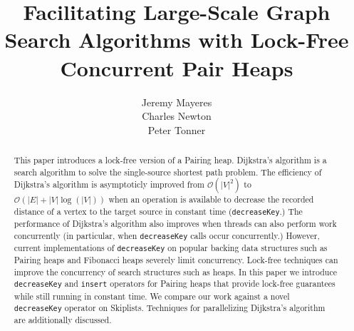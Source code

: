 \documentclass{acm_proc_article-sp}
\title{Facilitating Large-Scale Graph Search Algorithms with Lock-Free Concurrent Pair Heaps}
\author{
\alignauthor
Jeremy Mayeres \\
\email{jeremym@knights.ucf.edu}
%
\alignauthor
Charles Newton \\
\email{newton@knights.ucf.edu}
%
\alignauthor
Peter Tonner \\
\email{ptonner@knights.ucf.edu}
}
\begin{document}
\maketitle
\begin{abstract}
This paper introduces a lock-free version of a Pairing heap.
Dijkstra's algorithm is a search algorithm to solve
the single-source shortest path problem. The efficiency
of Dijkstra's algorithm is asymptoticly improved
from $\mathcal{O}(|V|^2)$ to $\mathcal{O}(|E| + |V|\log(|V|))$ when
an operation is available to decrease the recorded distance of a vertex
to the target source in constant time (\texttt{decreaseKey}.)
The performance of Dijkstra's algorithm
also improves when threads can also perform work concurrently (in particular, when
\texttt{decreaseKey} calls occur concurrently.) However, current implementations of
\texttt{decreaseKey} on popular backing data structures such as Pairing heaps and Fibonacci heaps
severely limit concurrency. Lock-free techniques can improve the concurrency of search structures
such as heaps. In this paper we introduce \texttt{decreaseKey} and \texttt{insert}
operators for Pairing heaps that provide lock-free guarantees while still running in constant time.
We compare our work against a novel \texttt{decreaseKey} operator on Skiplists.
Techniques for parallelizing Dijkstra's algorithm are additionally discussed.


\end{abstract}



\end{document}
